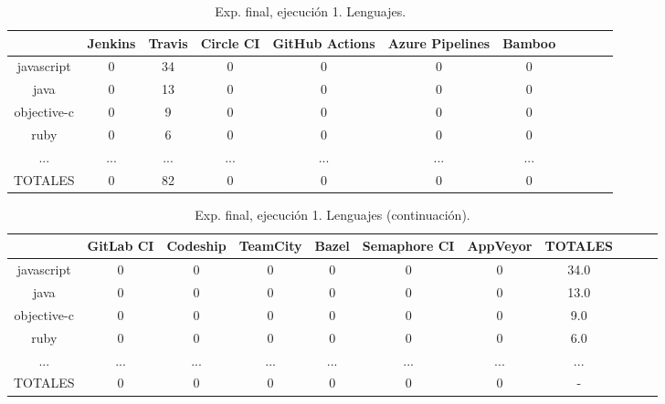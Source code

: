 \begin{table}[h]
  \centering
  \caption{Exp. final, ejecución 1. Lenguajes.}
  \label{tab:tabla_f3_2a}

\begin{footnotesize}
\renewcommand{\arraystretch}{1.5} %
\begin{tabular}{ccccccccccc}
  \hline
  {} &  Jenkins &  Travis &  Circle CI &  GitHub Actions &  Azure Pipelines &  Bamboo \\
  \hline
  javascript   &        0 &      34 &          0 &               0 &                0 &       0 \\
  java         &        0 &      13 &          0 &               0 &                0 &       0 \\
  objective-c  &        0 &       9 &          0 &               0 &                0 &       0 \\
  ruby         &        0 &       6 &          0 &               0 &                0 &       0 \\
  ...          &      ... &     ... &        ... &             ... &              ... &     ... \\
  TOTALES      &        0 &      82 &          0 &               0 &                0 &       0 \\
 \end{tabular}
\end{footnotesize}

\end{table}

\begin{table}[h]
  \centering
  \caption{Exp. final, ejecución 1. Lenguajes (continuación).}
  \label{tab:tabla_f3_2b}

\begin{footnotesize}
\renewcommand{\arraystretch}{1.5} %
\begin{tabular}{ccccccccccc}
  \hline
  {} &  GitLab CI &  Codeship &  TeamCity &  Bazel &  Semaphore CI &  AppVeyor &  TOTALES \\
  \hline
  javascript   &        0 &         0 &         0 &      0 &             0 &         0 &     34.0 \\
  java         &        0 &         0 &         0 &      0 &             0 &         0 &     13.0 \\
  objective-c  &        0 &         0 &         0 &      0 &             0 &         0 &      9.0 \\
  ruby         &        0 &         0 &         0 &      0 &             0 &         0 &      6.0 \\
  ...          &      ... &       ... &       ... &    ... &           ... &        ...&      ... \\
  TOTALES      &        0 &         0 &         0 &      0 &             0 &         0 &        - \\
 \end{tabular}
\end{footnotesize}

\end{table}

